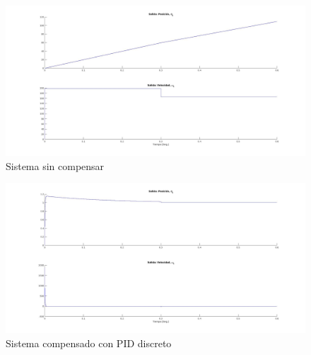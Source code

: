 \documentclass{article}
\begin{document}
\begin{figure}[!h]
  \centering
  \includegraphics[width=1\textwidth]{img/mot6-2.jpg}
  \caption{Sistema sin compensar}
\end{figure}

\begin{figure}[!h]
  \centering
  \includegraphics[width=1\textwidth]{img/mot6-1.jpg}
  \caption{Sistema compensado con PID discreto}
\end{figure}


\newpage
\end{document}
